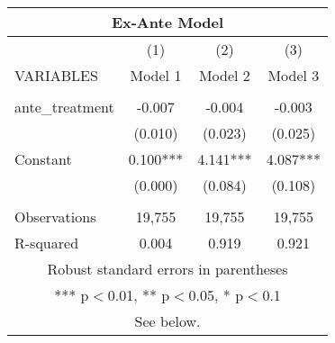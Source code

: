 \begin{tabular}{lccc}
\multicolumn{4}{c}{Ex-Ante Model} \\ \hline
 & (1) & (2) & (3) \\
VARIABLES & Model 1 & Model 2 & Model 3 \\ \hline
 &  &  &  \\
ante\_treatment & -0.007 & -0.004 & -0.003 \\
 & (0.010) & (0.023) & (0.025) \\
Constant & 0.100*** & 4.141*** & 4.087*** \\
 & (0.000) & (0.084) & (0.108) \\
 &  &  &  \\
Observations & 19,755 & 19,755 & 19,755 \\
 R-squared & 0.004 & 0.919 & 0.921 \\ \hline
\multicolumn{4}{c}{ Robust standard errors in parentheses} \\
\multicolumn{4}{c}{ *** p$<$0.01, ** p$<$0.05, * p$<$0.1} \\
\multicolumn{4}{c}{ See below.} \\
\end{tabular}
